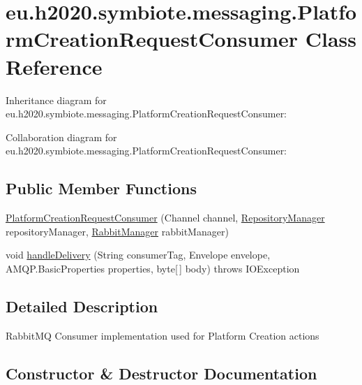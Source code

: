 \hypertarget{classeu_1_1h2020_1_1symbiote_1_1messaging_1_1PlatformCreationRequestConsumer}{}\section{eu.\+h2020.\+symbiote.\+messaging.\+Platform\+Creation\+Request\+Consumer Class Reference}
\label{classeu_1_1h2020_1_1symbiote_1_1messaging_1_1PlatformCreationRequestConsumer}


Inheritance diagram for eu.\+h2020.\+symbiote.\+messaging.\+Platform\+Creation\+Request\+Consumer\+:


Collaboration diagram for eu.\+h2020.\+symbiote.\+messaging.\+Platform\+Creation\+Request\+Consumer\+:
\subsection*{Public Member Functions}
\begin{DoxyCompactItemize}
\item 
\hyperlink{classeu_1_1h2020_1_1symbiote_1_1messaging_1_1PlatformCreationRequestConsumer_ac7f4497c390c067a2e42196b0e050bf9}{Platform\+Creation\+Request\+Consumer} (Channel channel, \hyperlink{classeu_1_1h2020_1_1symbiote_1_1repository_1_1RepositoryManager}{Repository\+Manager} repository\+Manager, \hyperlink{classeu_1_1h2020_1_1symbiote_1_1messaging_1_1RabbitManager}{Rabbit\+Manager} rabbit\+Manager)
\item 
void \hyperlink{classeu_1_1h2020_1_1symbiote_1_1messaging_1_1PlatformCreationRequestConsumer_a5effadb30758abb5f438be74a6c7f054}{handle\+Delivery} (String consumer\+Tag, Envelope envelope, A\+M\+Q\+P.\+Basic\+Properties properties, byte\mbox{[}$\,$\mbox{]} body)  throws I\+O\+Exception 
\end{DoxyCompactItemize}


\subsection{Detailed Description}
Rabbit\+MQ Consumer implementation used for Platform Creation actions 

\subsection{Constructor \& Destructor Documentation}
